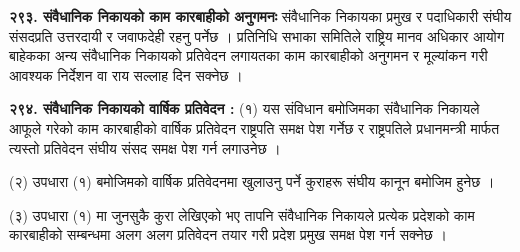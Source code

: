 \textbf{२९३. संवैधानिक निकायको काम कारबाहीको अनुगमनः} संवैधानिक निकायका प्रमुख र पदाधिकारी संघीय संसदप्रति उत्तरदायी र जवाफदेही रहनु पर्नेछ । प्रतिनिधि सभाका समितिले राष्ट्रिय मानव अधिकार आयोग बाहेकका अन्य संवैधानिक निकायको प्रतिवेदन लगायतका काम कारबाहीको अनुगमन र मूल्यांकन गरी आवश्यक निर्देशन वा राय सल्लाह दिन सक्नेछ ।

\textbf{२९४. संवैधानिक निकायको वार्षिक प्रतिवेदन :} (१) यस संविधान बमोजिमका संवैधानिक निकायले आफूले गरेको काम कारबाहीको वार्षिक प्रतिवेदन राष्ट्रपति समक्ष पेश गर्नेछ र राष्ट्रपतिले प्रधानमन्त्री मार्फत त्यस्तो प्रतिवेदन संघीय संसद समक्ष पेश गर्न लगाउनेछ ।

(२) उपधारा (१) बमोजिमको वार्षिक प्रतिवेदनमा खुलाउनु पर्ने कुराहरू संघीय कानून बमोजिम हुनेछ ।

(३) उपधारा (१) मा जुनसुकै कुरा लेखिएको भए तापनि संवैधानिक निकायले प्रत्येक प्रदेशको काम कारबाहीको सम्बन्धमा अलग अलग प्रतिवेदन तयार गरी प्रदेश प्रमुख समक्ष पेश गर्न सक्नेछ ।